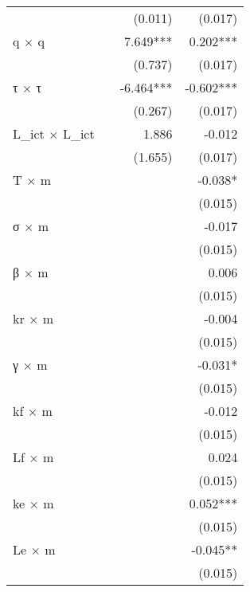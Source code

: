 \begin{tabular}{lrrr}
                       &            &    (0.011) &    (0.017) \\ 
q $\times$ q           &            &   7.649*** &   0.202*** \\ 
                       &            &    (0.737) &    (0.017) \\ 
τ $\times$ τ           &            &  -6.464*** &  -0.602*** \\ 
                       &            &    (0.267) &    (0.017) \\ 
L\_ict $\times$ L\_ict &            &      1.886 &     -0.012 \\ 
                       &            &    (1.655) &    (0.017) \\ 
T $\times$ m           &            &            &    -0.038* \\ 
                       &            &            &    (0.015) \\ 
σ $\times$ m           &            &            &     -0.017 \\ 
                       &            &            &    (0.015) \\ 
β $\times$ m           &            &            &      0.006 \\ 
                       &            &            &    (0.015) \\ 
kr $\times$ m          &            &            &     -0.004 \\ 
                       &            &            &    (0.015) \\ 
γ $\times$ m           &            &            &    -0.031* \\ 
                       &            &            &    (0.015) \\ 
kf $\times$ m          &            &            &     -0.012 \\ 
                       &            &            &    (0.015) \\ 
Lf $\times$ m          &            &            &      0.024 \\ 
                       &            &            &    (0.015) \\ 
ke $\times$ m          &            &            &   0.052*** \\ 
                       &            &            &    (0.015) \\ 
Le $\times$ m          &            &            &   -0.045** \\ 
                       &            &            &    (0.015) \\ 

\end{tabular}
